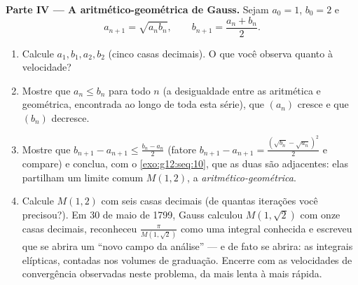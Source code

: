 \begin{problem}
\medskip
\noindent\textbf{Parte IV --- A  aritmético-geométrica de
Gauss.}
Sejam $a_0 = 1$, $b_0 = 2$ e
\[
a_{n+1} = \sqrt{a_n b_n},
\qquad
b_{n+1} = \frac{a_n + b_n}{2} .
\]
\begin{enumerate}[resume]
  \item Calcule $a_1, b_1, a_2, b_2$ (cinco casas decimais). O
        que você observa quanto à velocidade?
  \item Mostre que $a_n \leq b_n$ para todo $n$ (a desigualdade
        entre as  aritmética e geométrica, encontrada ao
        longo de toda esta série), que $(a_n)$ cresce e que
        $(b_n)$ decresce.
  \item Mostre que $b_{n+1} - a_{n+1} \leq \frac{b_n - a_n}{2}$
        (fatore $b_{n+1} - a_{n+1} =
        \frac{(\sqrt{b_n} - \sqrt{a_n})^2}{2}$ e compare) e
        conclua, com o \cref{exo:g12:seq:10}, que as duas
         são adjacentes: elas partilham um limite comum
        $M(1, 2)$, a \emph{ aritmético-geométrica}.
  \item Calcule $M(1, 2)$ com seis casas decimais (de quantas
        iterações você precisou?). Em 30 de maio de 1799, Gauss
        calculou $M(1, \sqrt2)$ com onze casas decimais,
        reconheceu $\frac{\pi}{M(1,\sqrt2)}$ como uma integral
        conhecida e escreveu que se abrira um ``novo campo da
        análise'' --- e de fato se abrira: as integrais
        elípticas, contadas nos volumes de graduação. Encerre com
        as velocidades de convergência observadas neste problema,
        da mais lenta à mais rápida.
\end{enumerate}
\end{problem}
